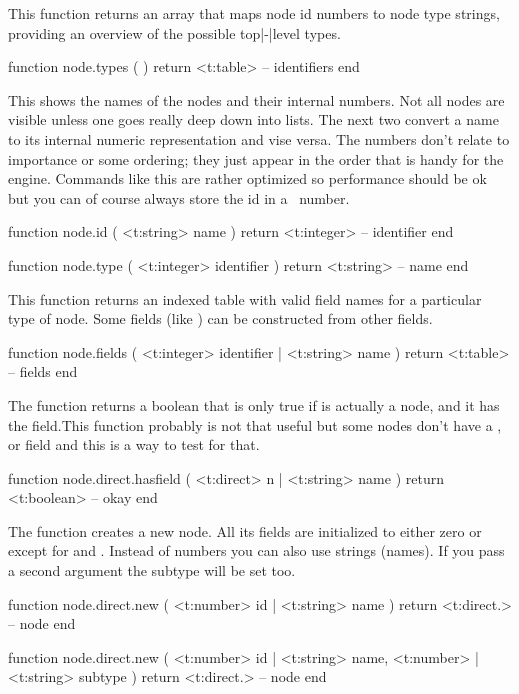 \stopsubsection

\startsubsection[title={Housekeeping}]

This function returns an array that maps node id numbers to node type strings,
providing an overview of the possible top|-|level  types.

\starttyping[option=LUA]
function node.types ( )
    return <t:table> -- identifiers
end
\stoptyping

This shows the names of the nodes and their internal numbers. Not all nodes are
visible unless one goes really deep down into lists. The next two convert a name
to its internal numeric representation and vise versa. The numbers don't relate
to importance or some ordering; they just appear in the order that is handy for
the engine. Commands like this are rather optimized so performance should be ok
but you can of course always store the id in a \LUA\ number.

\starttyping[option=LUA]
function node.id ( <t:string> name )
    return <t:integer> -- identifier
end

function node.type ( <t:integer> identifier )
    return <t:string> -- name
end
\stoptyping

This function returns an indexed table with valid field names for a particular
type of node. Some fields (like ) can be constructed from other
fields.

\starttyping[option=LUA]
function node.fields ( <t:integer> identifier | <t:string> name )
    return <t:table> -- fields
end
\stoptyping

The  function returns a boolean that is only true if  is
actually a node, and it has the field.This function probably is not that useful
but some nodes don't have a ,  or  field
and this is a way to test for that.

\starttyping[option=LUA]
function node.direct.hasfield ( <t:direct> n | <t:string> name )
    return <t:boolean> -- okay
end
\stoptyping

The  function creates a new node. All its fields are initialized to
either zero or  except for  and . Instead of
numbers you can also use strings (names). If you pass a second argument the
subtype will be set too.

\starttyping[option=LUA]
function node.direct.new (
    <t:number> id | <t:string> name
)
    return <t:direct.> -- node
end

function node.direct.new (
    <t:number> id | <t:string> name,
    <t:number> | <t:string> subtype
)
    return <t:direct.> -- node
end
\stoptyping

